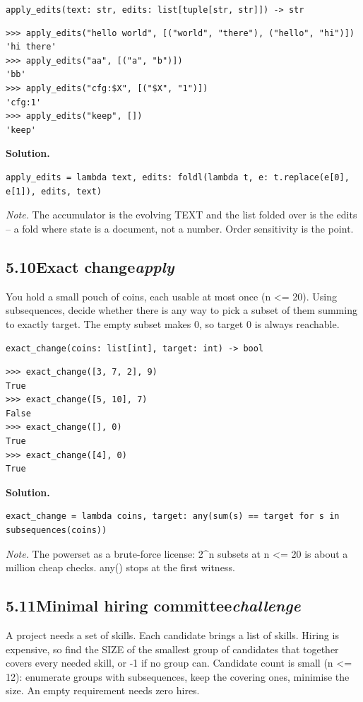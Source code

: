 \documentclass[10pt,letterpaper]{book}
\begin{document}
\noindent\texttt{apply\_edits(text: str, edits: list[tuple[str, str]]) -> str}
\begin{lstlisting}[style=ex]
>>> apply_edits("hello world", [("world", "there"), ("hello", "hi")])
'hi there'
>>> apply_edits("aa", [("a", "b")])
'bb'
>>> apply_edits("cfg:$X", [("$X", "1")])
'cfg:1'
>>> apply_edits("keep", [])
'keep'
\end{lstlisting}
\noindent\textbf{Solution.}
\begin{lstlisting}[style=code]
apply_edits = lambda text, edits: foldl(lambda t, e: t.replace(e[0], e[1]), edits, text)
\end{lstlisting}
\noindent\textit{Note.} The accumulator is the evolving TEXT and the list folded over is the edits -- a fold where state is a document, not a number. Order sensitivity is the point.

\subsection*{5.10\quad Exact change\hfill\textnormal{\textit{apply}}}
You hold a small pouch of coins, each usable at most once (n <= 20). Using subsequences, decide whether there is any way to pick a subset of them summing to exactly target. The empty subset makes 0, so target 0 is always reachable.

\noindent\texttt{exact\_change(coins: list[int], target: int) -> bool}
\begin{lstlisting}[style=ex]
>>> exact_change([3, 7, 2], 9)
True
>>> exact_change([5, 10], 7)
False
>>> exact_change([], 0)
True
>>> exact_change([4], 0)
True
\end{lstlisting}
\noindent\textbf{Solution.}
\begin{lstlisting}[style=code]
exact_change = lambda coins, target: any(sum(s) == target for s in subsequences(coins))
\end{lstlisting}
\noindent\textit{Note.} The powerset as a brute-force license: 2\^{}n subsets at n <= 20 is about a million cheap checks. any() stops at the first witness.

\subsection*{5.11\quad Minimal hiring committee\hfill\textnormal{\textit{challenge}}}
A project needs a set of skills. Each candidate brings a list of skills. Hiring is expensive, so find the SIZE of the smallest group of candidates that together covers every needed skill, or -1 if no group can. Candidate count is small (n <= 12): enumerate groups with subsequences, keep the covering ones, minimise the size. An empty requirement needs zero hires.
\end{document}
